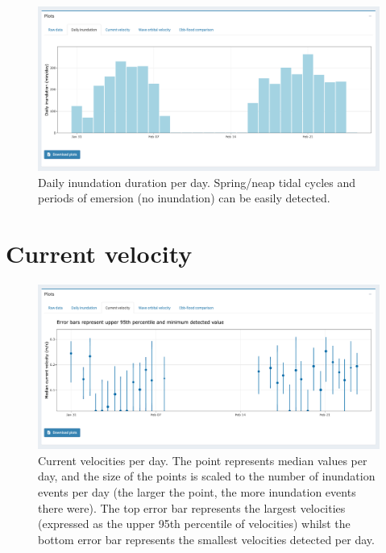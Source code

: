\documentclass[
  letterpaper,
  DIV=11,
  numbers=noendperiod]{scrreprt}
\begin{document}
\begin{figure}

{\centering \includegraphics[width=1\textwidth,height=\textheight]{chapters/figs/InundationData.png}

}

\caption{Daily inundation duration per day. Spring/neap tidal cycles and
periods of emersion (no inundation) can be easily detected.}

\end{figure}

\section{Current velocity}

\begin{figure}

{\centering \includegraphics[width=1\textwidth,height=\textheight]{chapters/figs/CurrentsData.png}

}

\caption{Current velocities per day. The point represents median values
per day, and the size of the points is scaled to the number of
inundation events per day (the larger the point, the more inundation
events there were). The top error bar represents the largest velocities
(expressed as the upper 95th percentile of velocities) whilst the bottom
error bar represents the smallest velocities detected per day.}

\end{figure}
\end{document}
